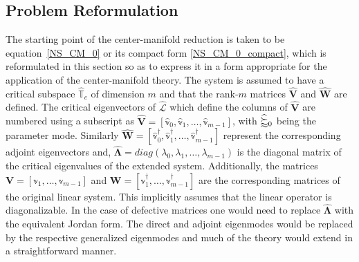\subsection{Problem Reformulation}
The starting point of the center-manifold reduction is taken to be equation~\eqref{NS_CM_0} or its compact form \eqref{NS_CM_0_compact}, which is reformulated in this section so as to express it in a form appropriate for the application of the center-manifold theory. The system is assumed to have a critical subspace $\mathds{\widehat{T}}_{c}$ of dimension $m$ and that the rank-$m$ matrices $\mathbf{\widehat{V}}$ and $\mathbf{\widehat{W}}$ are defined. The critical eigenvectors of $\mathcal{\widehat{L}}$ which define the columns of $\mathbf{\widehat{V}}$ are numbered using a subscript as $\mathbf{\widehat{V}} = [\mathbb{\widehat{v}}_{0}, \mathbb{\widehat{v}}_{1}, \ldots, \mathbb{\widehat{v}}_{m-1}]$, with $\mathbb{\widehat{v}}_{0}$ being the parameter mode. Similarly $\mathbf{\widehat{W}} = [\mathbb{\widehat{v}}^{\dagger}_{0}, \mathbb{\widehat{v}}^{\dagger}_{1}, \ldots, \mathbb{\widehat{v}}^{\dagger}_{m-1}] $ represent the corresponding adjoint eigenvectors and, $\mathbf{\widehat{\Lambda}} = diag(\lambda_{0},\lambda_{1},\ldots,\lambda_{m-1})$ is the diagonal matrix of the critical eigenvalues of the extended system. Additionally, the matrices $\mathbf{V} = [\mathbb{v}_{1}, \ldots, \mathbb{v}_{m-1}]$ and $\mathbf{W} = [\mathbb{v}^{\dagger}_{1}, \ldots, \mathbb{v}^{\dagger}_{m-1}]$ are the corresponding matrices of the original linear system. This implicitly assumes that the linear operator is diagonalizable. In the case of defective matrices one would need to replace $\mathbf{\widehat{\Lambda}}$ with the equivalent Jordan form. The direct and adjoint eigenmodes would be replaced by the respective generalized eigenmodes and much of the theory would extend in a straightforward manner. 

